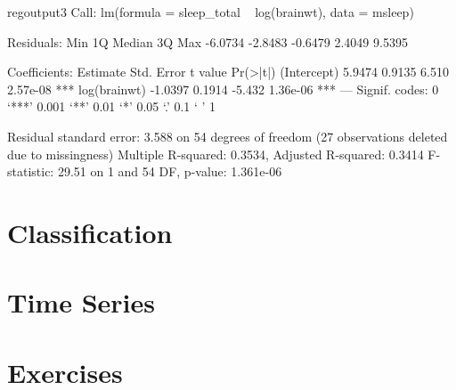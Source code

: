 \begin{SaveVerbatim}{regoutput3}
Call:
lm(formula = sleep_total ~ log(brainwt), data = msleep)

Residuals:
    Min      1Q  Median      3Q     Max 
-6.0734 -2.8483 -0.6479  2.4049  9.5395 

Coefficients:
             Estimate Std. Error t value Pr(>|t|)    
(Intercept)    5.9474     0.9135   6.510 2.57e-08 ***
log(brainwt)  -1.0397     0.1914  -5.432 1.36e-06 ***
---
Signif. codes:  0 ‘***’ 0.001 ‘**’ 0.01 ‘*’ 0.05 ‘.’ 0.1 ‘ ’ 1

Residual standard error: 3.588 on 54 degrees of freedom
  (27 observations deleted due to missingness)
Multiple R-squared:  0.3534,	Adjusted R-squared:  0.3414 
F-statistic: 29.51 on 1 and 54 DF,  p-value: 1.361e-06
\end{SaveVerbatim}

\begin{figure}
\end{figure}


\section{Classification}

\section{Time Series}

\section{Exercises}

